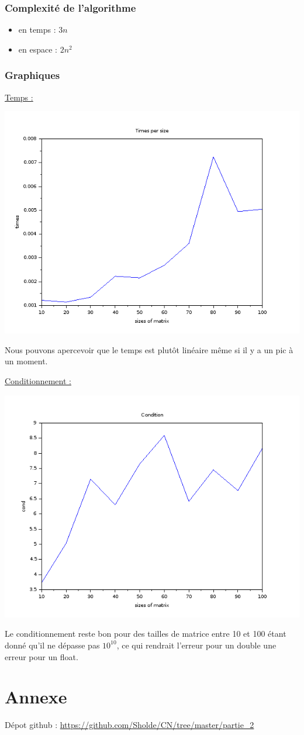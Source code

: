 \documentclass{article}
\begin{document}
\subsubsection*{Complexité de l'algorithme}

\begin{itemize}
\item en temps : $3n$
\item en espace : $2n^2$
\end{itemize}

\subsubsection*{Graphiques}

\underline{Temps :}

\includegraphics[scale=0.5]{img/lu_times.png}

Nous pouvons apercevoir que le temps est plutôt linéaire même si il y
a un pic à un moment.\newline

\underline{Conditionnement :}

\includegraphics[scale=0.5]{img/lu_cond.png}

Le conditionnement reste bon pour des tailles de matrice entre 10 et
100 étant donné qu'il ne dépasse pas $10^{10}$, ce qui rendrait l'erreur
pour un double une erreur pour un float.

\section*{Annexe}

Dépot github : \url{https://github.com/Sholde/CN/tree/master/partie_2}
\end{document}

